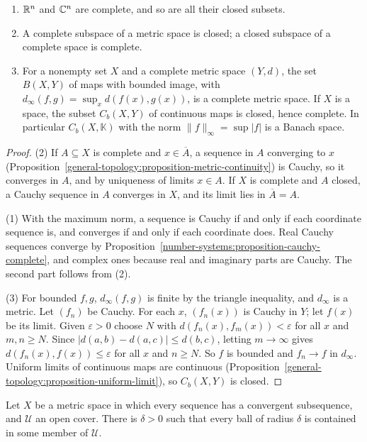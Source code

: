 \begin{proposition}\label{general-topology:proposition-complete-examples}
\begin{enumerate}
\item $\mathbb{R}^n$ and $\mathbb{C}^n$ are complete, and so are all their closed subsets.
\item A complete subspace of a metric space is closed; a closed subspace of a complete space is complete.
\item For a nonempty set $X$ and a complete metric space $(Y, d)$, the set $B(X, Y)$ of maps with bounded image, with
$d_\infty(f, g) = \sup_x d(f(x), g(x))$, is a complete metric space. If $X$ is a space, the subset $C_b(X, Y)$ of continuous maps is closed, hence complete.
In particular $C_b(X, \mathbb{K})$ with the norm $\|f\|_\infty = \sup |f|$ is a Banach space.
\end{enumerate}
\end{proposition}

\begin{proof}
(2) If $A \subseteq X$ is complete and $x \in \overline{A}$, a sequence in $A$ converging to $x$ (Proposition~\ref{general-topology:proposition-metric-continuity})
is Cauchy, so it converges in $A$, and by uniqueness of limits $x \in A$. If $X$ is complete and $A$ closed, a Cauchy sequence in $A$ converges in $X$, and its
limit lies in $\overline{A} = A$.

(1) With the maximum norm, a sequence is Cauchy if and only if each coordinate sequence is, and converges if and only if each coordinate does. Real
Cauchy sequences converge by Proposition~\ref{number-systems:proposition-cauchy-complete}, and complex ones because real and imaginary parts are
Cauchy. The second part follows from (2).

(3) For bounded $f, g$, $d_\infty(f, g)$ is finite by the triangle inequality, and $d_\infty$ is a metric. Let $(f_n)$ be Cauchy. For each $x$, $(f_n(x))$ is
Cauchy in $Y$; let $f(x)$ be its limit. Given $\varepsilon > 0$ choose $N$ with $d(f_n(x), f_m(x)) < \varepsilon$ for all $x$ and $m, n \geq N$. Since
$|d(a, b) - d(a, c)| \leq d(b, c)$, letting $m \to \infty$ gives $d(f_n(x), f(x)) \leq \varepsilon$ for all $x$ and $n \geq N$. So $f$ is bounded and
$f_n \to f$ in $d_\infty$. Uniform limits of continuous maps are continuous (Proposition~\ref{general-topology:proposition-uniform-limit}), so $C_b(X, Y)$ is
closed.
\end{proof}

\begin{lemma}\label{general-topology:lemma-lebesgue-number}
Let $X$ be a metric space in which every sequence has a convergent subsequence, and $\mathcal{U}$ an open cover. There is $\delta > 0$ such that every
ball of radius $\delta$ is contained in some member of $\mathcal{U}$.
\end{lemma}

